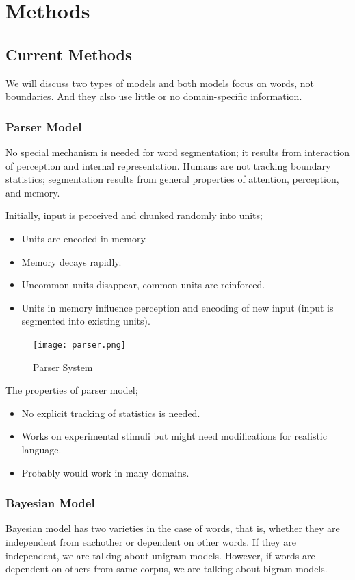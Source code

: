 \documentclass[12pt]{comjnl}
\begin{document}
\section{Methods}
\subsection{Current Methods}
We will discuss two types of models and both models focus on words, not boundaries. And they also use little or no domain-specific information.

\subsubsection{Parser Model}
No special mechanism is needed for word segmentation; it results from interaction of perception
and internal representation. Humans are not tracking boundary statistics; segmentation results from general properties of attention, perception, and memory.

Initially, input is perceived and chunked randomly into units;
\begin{itemize}
\item Units are encoded in memory.
\item Memory decays rapidly.
\item Uncommon units disappear, common units are reinforced.
\item Units in memory influence perception and encoding of new input (input is segmented into existing units).
\end{itemize}

\begin{figure}[htbp]
\centering
\texttt{[image: parser.png]}
\caption{Parser System}\label{fig:parser}
\end{figure}

The properties of parser model;
\begin{itemize}
\item No explicit tracking of statistics is needed.
\item Works on experimental stimuli but might need modifications for realistic language.
\item Probably would work in many domains.
\end{itemize}

\subsubsection{Bayesian Model}
Bayesian model has two varieties in the case of words, that is, whether they are independent from eachother or dependent on other words. If they are independent, we are talking about unigram models. However, if words are dependent on others from same corpus, we are talking about bigram models.
\end{document}
